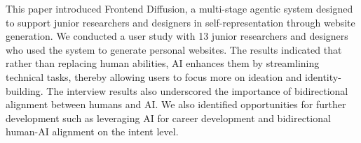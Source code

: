 This paper introduced Frontend Diffusion, a multi-stage agentic system designed to support junior researchers and designers in self-representation through website generation. We conducted a user study with 13 junior researchers and designers who used the system to generate personal websites. The results indicated that rather than replacing human abilities, AI enhances them by streamlining technical tasks, thereby allowing users to focus more on ideation and identity-building. The interview results also underscored the importance of bidirectional alignment between humans and AI. We also identified opportunities for further development such as leveraging AI for career development and bidirectional human-AI alignment on the intent level.
